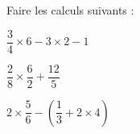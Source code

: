 \documentclass{automatisme}
\begin{document}
\begin{frame}
	Faire les calculs suivants :
	\setlength{\columnseprule}{1pt}
	\begin{multicols}{3}
		$\dfrac{3}{4}×6 - 3 × 2 - 1$

		\vspace*{6em}

		\columnbreak

		$\dfrac{2}{8} × \dfrac{6}{2} + \dfrac{12}{5}$
		\columnbreak
		
		$2 × \dfrac{5}{6} - \left(\dfrac{1}{3} + 2×4\right)$
	\end{multicols}
\end{frame}
\end{document}
